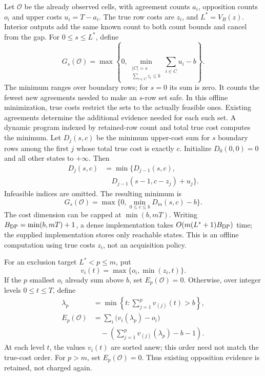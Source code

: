 Let $\mathcal O$ be the already observed cells, with agreement counts $a_i$, opposition counts $o_i$ and upper costs $u_i=T-a_i$. The true row costs are $z_i$, and $L^*=V_B(z)$. Interior outputs add the same known count to both count bounds and cancel from the gap. For $0\le s\le L^*$, define
\[
 G_s(\mathcal O)=\max\left\{0,
 \min_{\substack{|C|=s\\\sum_{i\in C}z_i\le b}}
 \sum_{i\in C}u_i-b\right\}.
\]
The minimum ranges over boundary rows; for $s=0$ its sum is zero. It counts the fewest new agreements needed to make an $s$-row set safe. In this offline minimization, true costs restrict the sets to the actually feasible ones. Existing agreements determine the additional evidence needed for each such set. A dynamic program indexed by retained-row count and total true cost computes the minimum. Let $D_j(s,c)$ be the minimum upper-cost sum for $s$ boundary rows among the first $j$ whose total true cost is exactly $c$. Initialize $D_0(0,0)=0$ and all other states to $+\infty$. Then
\[
 \begin{aligned} D_j(s,c)&=\min\{D_{j-1}(s,c),\\
 &\quad D_{j-1}(s-1,c-z_j)+u_j\}.\end{aligned}
\]
Infeasible indices are omitted. The resulting minimum is
\[
 G_s(\mathcal O)=\max\Big\{0,\min_{0\le c\le b}D_m(s,c)-b\Big\}.
\]
The cost dimension can be capped at $\min(b,mT)$. Writing $B_{\rm DP}=\min(b,mT)+1$, a dense implementation takes $O(m(L^*+1)B_{\rm DP})$ time; the supplied implementation stores only reachable states. This is an offline computation using true costs $z_i$, not an acquisition policy.

For an exclusion target $L^*<p\le m$, put
\[
 v_i(t)=\max\{o_i,\min(z_i,t)\}.
\]
If the $p$ smallest $o_i$ already sum above $b$, set $E_p(\mathcal O)=0$. Otherwise, over integer levels $0\le t\le T$, define
\begin{align*}
 \lambda_p&=\min\left\{t:
 \sum_{j=1}^{p}v_{(j)}(t)>b\right\},\\
 E_p(\mathcal O)&=\sum_i\big(v_i(\lambda_p)-o_i\big)\\
 &\quad-\left(\sum_{j=1}^{p}v_{(j)}(\lambda_p)-b-1\right).
\end{align*}
At each level $t$, the values $v_i(t)$ are sorted anew; this order need not match the true-cost order. For $p>m$, set $E_p(\mathcal O)=0$. Thus existing opposition evidence is retained, not charged again.

